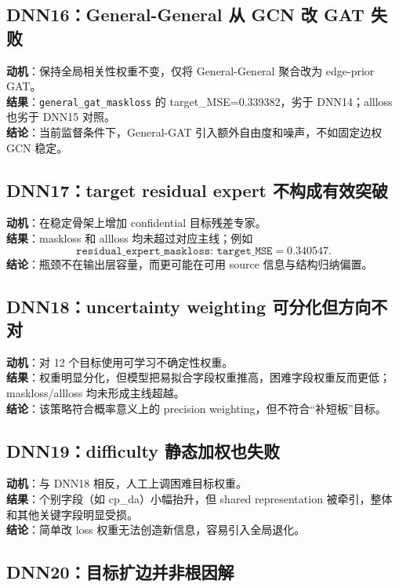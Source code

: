 \documentclass[UTF8]{ctexart}
\begin{document}
\subsection{DNN16：General-General 从 GCN 改 GAT 失败}

\textbf{动机}：保持全局相关性权重不变，仅将 General-General 聚合改为 edge-prior GAT。\\
\textbf{结果}：\texttt{general\_gat\_maskloss} 的 target\_MSE=0.339382，劣于 DNN14；allloss 也劣于 DNN15 对照。\\
\textbf{结论}：当前监督条件下，General-GAT 引入额外自由度和噪声，不如固定边权 GCN 稳定。

\subsection{DNN17：target residual expert 不构成有效突破}

\textbf{动机}：在稳定骨架上增加 confidential 目标残差专家。\\
\textbf{结果}：maskloss 和 allloss 均未超过对应主线；例如
\[
\texttt{residual\_expert\_maskloss: target\_MSE}=0.340547.
\]
\textbf{结论}：瓶颈不在输出层容量，而更可能在可用 source 信息与结构归纳偏置。

\subsection{DNN18：uncertainty weighting 可分化但方向不对}

\textbf{动机}：对 12 个目标使用可学习不确定性权重。\\
\textbf{结果}：权重明显分化，但模型把易拟合字段权重推高，困难字段权重反而更低；maskloss/allloss 均未形成主线超越。\\
\textbf{结论}：该策略符合概率意义上的 precision weighting，但不符合“补短板”目标。

\subsection{DNN19：difficulty 静态加权也失败}

\textbf{动机}：与 DNN18 相反，人工上调困难目标权重。\\
\textbf{结果}：个别字段（如 cp\_da）小幅抬升，但 shared representation 被牵引，整体和其他关键字段明显受损。\\
\textbf{结论}：简单改 loss 权重无法创造新信息，容易引入全局退化。

\subsection{DNN20：目标扩边并非根因解}
\end{document}
